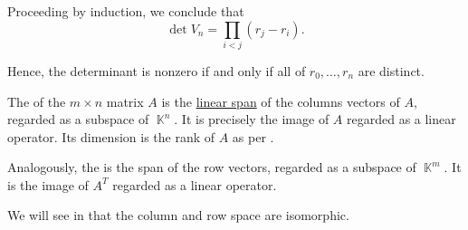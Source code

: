 \begin{example}
  Proceeding by induction, we conclude that
  \begin{equation}\label{eq:ex:vandermonde_matrix/determinant}
    \det V_n = \prod_{i < j} (r_j - r_i).
  \end{equation}

  Hence, the determinant is nonzero if and only if all of \( r_0, \ldots, r_n \) are distinct.
\end{example}

\begin{definition}\label{def:column_and_row_spaces}
  The  of the \( m \times n \) matrix \( A \) is the \hyperref[def:module/submodel]{linear span} of the columns vectors of \( A \), regarded as a subspace of \( \BbbK^n \). It is precisely the image of \( A \) regarded as a linear operator. Its dimension is the rank of \( A \) as per .

  Analogously, the  is the span of the row vectors, regarded as a subspace of \( \BbbK^m \). It is the image of \( A^T \) regarded as a linear operator.

  We will see in  that the column and row space are isomorphic.
\end{definition}


